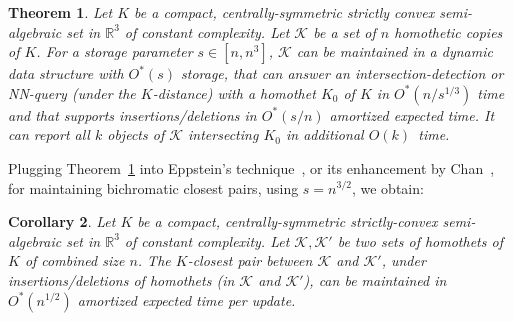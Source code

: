 \documentclass[11pt]{article}
\def\reals{{\mathbb R}}
\def\K{\mathcal{K}}
\newtheorem{theorem}{Theorem}[section]
\newtheorem{corollary}[theorem]{Corollary}
\theoremstyle{definition}
\begin{document}
\begin{theorem} \label{thm:NN}
Let $K$ be a compact, centrally-symmetric strictly convex semi-algebraic set
in $\reals^3$ of constant complexity.  Let $\K$ be a set of $n$ homothetic 
copies of $K$. For a storage parameter $s \in [n,n^3]$, $\K$ can be maintained in a dynamic data 
	structure with $O^*(s)$ storage, that can answer an intersection-detection or NN-query (under the $K$-distance) 
	with a homothet $K_0$ of $K$ 
	in $O^*(n/s^{1/3})$ time and that supports insertions/deletions in $O^*(s/n)$ 
	amortized expected time. It can report all $k$ objects of $\K$ intersecting $K_0$ in additional $O(k)$~time.
\end{theorem}
Plugging Theorem~\ref{thm:NN} into Eppstein's technique~\cite{Epp}, or its enhancement by Chan~\cite{Chan:bcp},
for maintaining bichromatic closest pairs, using $s=n^{3/2}$, we obtain:
\begin{corollary}
	\label{cor:bcp}
Let $K$ be a compact, centrally-symmetric strictly-convex semi-algebraic set
in $\reals^3$ of constant complexity. Let $\K, \K'$ be two sets of homothets of $K$
of combined size $n$. The $K$-closest pair between $\K$ and $\K'$,
under insertions/deletions of homothets (in $\K$ and $\K'$), can be 
maintained in $O^*(n^{1/2})$ amortized expected time per update.
\end{corollary}
\end{document}

